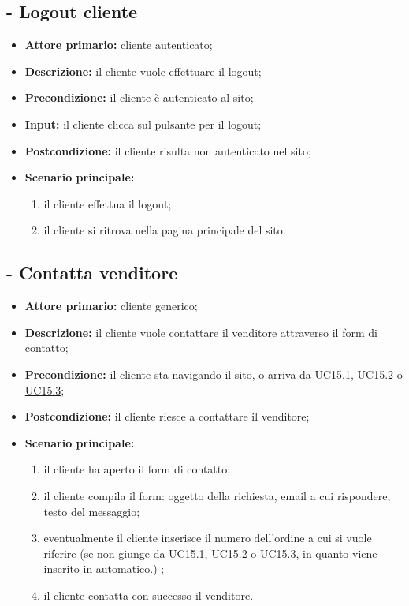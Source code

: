 \stepUserCase
\subsection{ - Logout cliente}
\begin{itemize}
    \item \textbf{Attore primario:} cliente autenticato;
    \item \textbf{Descrizione:} il cliente vuole effettuare il logout;
    \item \textbf{Precondizione:} il cliente è autenticato al sito;
    \item \textbf{Input:} il cliente clicca sul pulsante per il logout;
    \item \textbf{Postcondizione:} il cliente risulta non autenticato nel sito;
    \item \textbf{Scenario principale:}
          \begin{enumerate}
              \item il cliente effettua il logout;
              \item il cliente si ritrova nella pagina principale del sito.
          \end{enumerate}
\end{itemize}

\stepUserCase
\subsection{ - Contatta venditore}
\begin{itemize}
    \item \textbf{Attore primario:} cliente generico;
    \item \textbf{Descrizione:} il cliente vuole contattare il venditore attraverso il form di contatto;
    \item \textbf{Precondizione:} il cliente sta navigando il sito, o arriva da \hyperref[UC15.1]{UC15.1}, \hyperref[UC15.2]{UC15.2} o \hyperref[UC15.3]{UC15.3};
    \item \textbf{Postcondizione:} il cliente riesce a contattare il venditore;
    \item \textbf{Scenario principale:}
          \begin{enumerate}
              \item il cliente ha aperto il form di contatto;
              \item il cliente compila il form: oggetto della richiesta, email a cui rispondere, testo del messaggio;
              \item eventualmente il cliente inserisce il numero dell'ordine a cui si vuole riferire (se non giunge da \hyperref[UC15.1]{UC15.1}, \hyperref[UC15.2]{UC15.2} o \hyperref[UC15.3]{UC15.3}, in quanto viene inserito in automatico.) ;
              \item il cliente contatta con successo il venditore.
          \end{enumerate}
\end{itemize}


